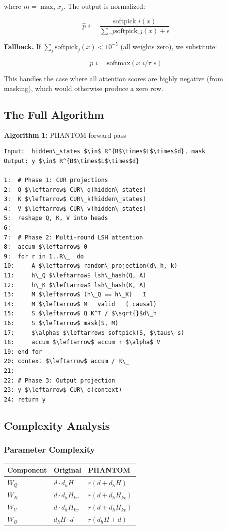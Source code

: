 where $m = \max_j x_j$. The output is normalized:

\[
\hat{p}\_i = \frac{\text{softpick}\_i(x)}{\sum\_j \text{softpick}\_j(x) + \epsilon}
\tag{4.25}
\]

\textbf{Fallback.} If $\sum_j \text{softpick}_j(x) < 10^{-5}$ (all weights zero), 
we substitute:

\[
p\_i = \text{softmax}(x\_i / \tau\_s)
\tag{4.26}
\]

This handles the case where all attention scores are highly negative (from 
masking), which would otherwise produce a zero row.

\subsection{The Full Algorithm}

\textbf{Algorithm 1:} PHANTOM forward pass
\begin{lstlisting}
Input:  hidden\_states $\in$ R^{B$\times$L$\times$d}, mask
Output: y $\in$ R^{B$\times$L$\times$d}

1:  # Phase 1: CUR projections
2:  Q $\leftarrow$ CUR\_q(hidden\_states)
3:  K $\leftarrow$ CUR\_k(hidden\_states)
4:  V $\leftarrow$ CUR\_v(hidden\_states)
5:  reshape Q, K, V into heads
6:
7:  # Phase 2: Multi-round LSH attention
8:  accum $\leftarrow$ 0
9:  for r in 1..R\_  do
10:     A $\leftarrow$ random\_projection(d\_h, k)
11:     h\_Q $\leftarrow$ lsh\_hash(Q, A)
12:     h\_K $\leftarrow$ lsh\_hash(K, A)
13:     M $\leftarrow$ (h\_Q == h\_K)   I
14:     M $\leftarrow$ M   valid   ( causal)
15:     S $\leftarrow$ Q K^T / $\sqrt{}$d\_h
16:     S $\leftarrow$ mask(S, M)
17:     $\alpha$ $\leftarrow$ softpick(S, $\tau$\_s)
18:     accum $\leftarrow$ accum + $\alpha$ V
19: end for
20: context $\leftarrow$ accum / R\_ 
21:
22: # Phase 3: Output projection
23: y $\leftarrow$ CUR\_o(context)
24: return y
\end{lstlisting}

\subsection{Complexity Analysis}

\subsubsection{Parameter Complexity}

\begin{table}[H]
\centering
\small
\begin{tabular}{lll}
\toprule
\textbf{Component} & \textbf{Original} & \textbf{PHANTOM} \\
\midrule
$W_Q$ & $d \cdot d_h H$ & $r(d + d_h H)$ \\
$W_K$ & $d \cdot d_h H_{kv}$ & $r(d + d_h H_{kv})$ \\
$W_V$ & $d \cdot d_h H_{kv}$ & $r(d + d_h H_{kv})$ \\
$W_O$ & $d_h H \cdot d$ & $r(d_h H + d)$ \\
\bottomrule
\end{tabular}
\end{table}

